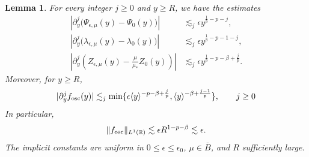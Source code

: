\documentclass[11pt]{amsart}
\newtheorem{lemma}[theorem]{Lemma}
\theoremstyle{definition}
\theoremstyle{remark}
\numberwithin{equation}{section}
\newcommand{\R}{\mathbb{R}}
\newcommand{\ov}[1]{\overline{#1}}
\newcommand{\ang}[1]{\langle #1 \rangle}
\begin{document}
\begin{lemma}\label{lem:approx_phase_differences}
    For every integer $j\geq0$ and $y\geq R$, we have the estimates
    \begin{align}
        \left|\partial_y^j\bigl(\Psi_{\epsilon,\mu}(y)-\Psi_0(y)\bigr)\right|
        &\lesssim_j\epsilon y^{\frac1p-p-j},
        \label{eqn:approx_phase_difference}\\
        \left|\partial_y^j\bigl(\lambda_{\epsilon,\mu}(y)-\lambda_0(y)\bigr)\right|
        &\lesssim_j\epsilon y^{\frac1p-p-1-j},
        \label{eqn:approx_lambda_difference}\\
        \left|\partial_y^j\left(Z_{\epsilon,\mu}(y)-\frac{\mu}{\mu_*}Z_0(y)\right)\right|
        &\lesssim_j\epsilon y^{\frac1p-p-\beta+\frac{j}{p}}.
        \label{eqn:approx_Z_difference}
    \end{align}
    Moreover, for $y \geq R$,
    \begin{equation}\label{eqn:approx_fosc_bounds}
        |\partial_y^j f_{\textup{osc}}(y)|
        \lesssim_j \min\{\epsilon\ang{y}^{-p-\beta+\frac{j}{p}}, \ang{y}^{-\beta + \frac{j-1}{p}} \}, \qquad j \geq 0
    \end{equation}
    In particular,
    \begin{equation}\label{eqn:approx_fosc_L1_bound}
        \|f_{\textup{osc}}\|_{L^1(\R)}
        \lesssim\epsilon R^{1-p-\beta}\lesssim\epsilon.
    \end{equation}
    The implicit constants are uniform in $0\leq\epsilon\leq\epsilon_0$, $\mu\in\ov{B}$, and $R$ sufficiently large.
\end{lemma}
\end{document}
